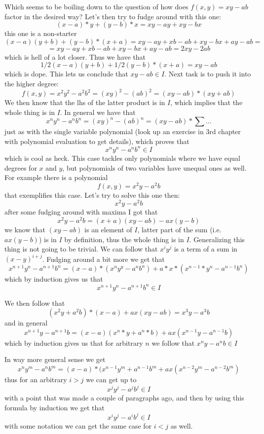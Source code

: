\documentclass[11pt,oneside,titlepage]{book}
\begin{document}
Which seems to be boiling down to the question of how does
$f(x, y) = xy - ab$ factor in the desired way? Let's then
try to fudge around with this one:
$$(x - a) * y + (y - b) * x = xy - ay + xy - bx $$
this one is a non-starter
$$(x - a)(y + b) + (y - b) * (x + a) = xy - ay + xb - ab + xy - bx + ay - ab =$$
$$= 
xy - ay + xb - ab + xy - bx + ay - ab = 2xy - 2ab$$
which is hell of a lot closer. Thus we have that
$$1/2(x - a)(y + b) + 1/2(y - b) * (x + a) = xy - ab$$
which is dope. This lets us conclude that $xy - ab \in I$.
Next task is to push it into the higher degree:
$$f(x, y) = x^2y^2 - a^2 b^2 = (xy)^2 - (ab)^2 = (xy - ab) * (xy + ab)$$
We then know that the lhs of the latter product is in $I$, which implies that
the whole thing is in $I$. In general we have that
$$x^ny^n - a^n b^n = (xy)^n - (ab)^n = (xy - ab) * \sum{...}$$
just as with the single variable polynomial (look up an exercise in 3rd
chapter with polynomial evaluation to get details), which proves that
$$x^ny^n - a^n b^n \in I$$
which is cool as heck. This case tackles only polynomials where we have equal degrees
for $x$ and $y$, but polynomials of two variables have unequal ones as well. For example
there is a polynomial
$$f(x, y) = x^2y - a^2b$$
that exemplifies this case. Let's try to solve this one then:
$$x^2y - a^2b$$
after some fudging around with maxima I got that
$$x^2y - a^2b = (x + a) (xy - ab) - ax (y - b)$$
we know that $(xy - ab)$ is an element of $I$, latter part of the sum
(i.e. $ax (y - b)$) is in $I$ by definition, thus the whole thing is
in $I$. Generalizing this thing is not going to be trivial. We can follow
that $x^i y^j$ is a term of a sum in $(x - y)^{i + j}$.
Fudging around a bit more we get that
$$x^{n + 1}y^n - a^{n + 1}b^n =
(x - a) * (x^n y^y - a^n b^n) + a * x * (x^{n - 1} * y^n - a^{n - 1}b^n)$$
which by induction gives us that
$$x^{n + 1}y^n - a^{n + 1}b^n \in I$$

We then follow that
$$(x^2y + a^2b) * (x - a) + a x(xy - ab) = x^3 y - a^3 b$$
and in general
$$x^{n + 1}y - a^{n + 1}b =
(x - a)(x^n * y + a^n * b) + ax(x^{n - 1}y - a^{n - 1}b)$$
which by induction gives us that for arbitrary $n$ we follow that
$x^{n}y - a^{n}b \in I$

In way more general sense we get
$$x^ny^m - a^nb^m =
(x - a) * (x^{n - 1} y^m + a^{n - 1}b^m + ax(x^{n - 2}y^m - a^{n - 2}b^m)$$
thus for an arbitrary $i > j$ we can get up to
$$x^j y^j - a^j b^j \in I$$
with a point that was made a couple of paragraphs ago, and then by using
this formula by induction we get that
$$x^i y^j - a^i b^j \in I$$
with some notation we can get the same case for $i < j$ as well.
\end{document}
